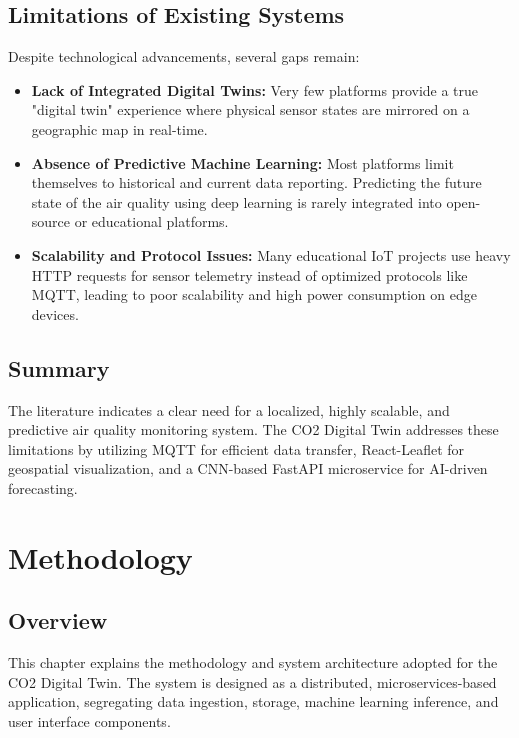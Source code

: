 \documentclass[a4paper, 12pt]{report}
\begin{document}
\section{Limitations of Existing Systems}
Despite technological advancements, several gaps remain:
\begin{itemize}
	\item \textbf{Lack of Integrated Digital Twins:} Very few platforms provide a true "digital twin" experience where physical sensor states are mirrored on a geographic map in real-time.
	\item \textbf{Absence of Predictive Machine Learning:} Most platforms limit themselves to historical and current data reporting. Predicting the future state of the air quality using deep learning is rarely integrated into open-source or educational platforms.
	\item \textbf{Scalability and Protocol Issues:} Many educational IoT projects use heavy HTTP requests for sensor telemetry instead of optimized protocols like MQTT, leading to poor scalability and high power consumption on edge devices.
\end{itemize}

\section{Summary}
The literature indicates a clear need for a localized, highly scalable, and predictive air quality monitoring system. The CO2 Digital Twin addresses these limitations by utilizing MQTT for efficient data transfer, React-Leaflet for geospatial visualization, and a CNN-based FastAPI microservice for AI-driven forecasting.

\chapter{Methodology}

\section{Overview}
This chapter explains the methodology and system architecture adopted for the CO2 Digital Twin. The system is designed as a distributed, microservices-based application, segregating data ingestion, storage, machine learning inference, and user interface components.
\end{document}
